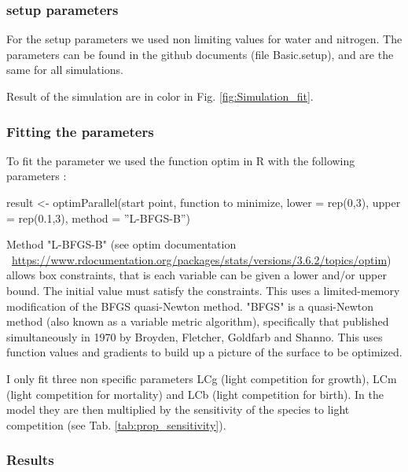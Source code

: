 \documentclass{article}
\begin{document}
\subsubsection{setup parameters}

For the setup parameters we used non limiting values for water and nitrogen. The parameters can be found in the github documents (file Basic.setup), and are the same for all simulations.

Result of the simulation are in color in Fig. \ref{fig:Simulation_fit}.

\subsubsection{Fitting the parameters}

To fit the parameter we used the function optim in R with the following parameters :

\begin{tcolorbox}
result <- optimParallel(start point, function to minimize, lower = rep(0,3), upper = rep(0.1,3), method = ''L-BFGS-B'')
\end{tcolorbox}

Method "L-BFGS-B" (see optim documentation ~\url{https://www.rdocumentation.org/packages/stats/versions/3.6.2/topics/optim}) allows box constraints, that is each variable can be given a lower and/or upper bound. The initial value must satisfy the constraints. This uses a limited-memory modification of the BFGS quasi-Newton method.  "BFGS" is a quasi-Newton method (also known as a variable metric algorithm), specifically that published simultaneously in 1970 by Broyden, Fletcher, Goldfarb and Shanno. This uses function values and gradients to build up a picture of the surface to be optimized.

I only fit three non specific parameters LCg (light competition for growth), LCm (light competition for mortality) and LCb (light competition for birth). In the model they are then multiplied by the sensitivity of the species to light competition (see Tab. \ref{tab:prop_sensitivity}).

\subsubsection{Results}
\end{document}
